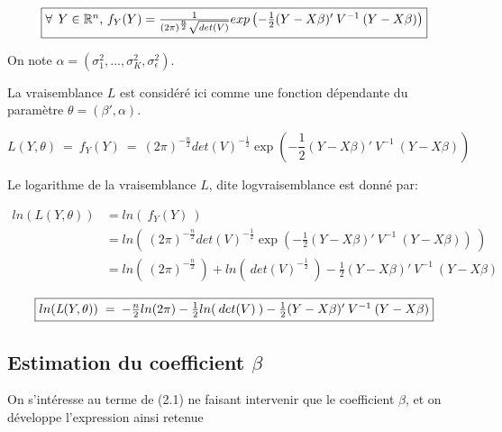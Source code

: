 \documentclass[11pt,fleqn]{book} %
\begin{document}
	\begin{equation*}
		\fbox{$
			\forall\:\: Y \in \mathbb{R}^{n}$, $f_{Y}(Y)=\frac{1}{(2\pi)^{\frac{n}{2}}\sqrt{det(V)}}exp\left(-\frac{1}{2}(Y-X\beta)'\:V^{-1}\:(Y-X\beta)\right) 
			$}
	\end{equation*}
	
	\vspace{1em}
	
	On note $\alpha=(\sigma_1^2,...,\sigma_K^2,\sigma_{\epsilon}^2)$.
	
	
	\vspace{1em}
	
	La vraisemblance $L$ est considéré ici comme une fonction dépendante du paramètre $\theta=(\beta',\alpha)$.
	
	
	\begin{equation*}
		\textit{L}(Y,\theta) \:=\:  f_{Y}(Y) \:=\:  (2\pi)^{-\frac{n}{2}} det(V)^{-\frac{1}{2}} \exp\left(-\frac{1}{2}(Y-X\beta)'\:V^{-1}\:(Y-X\beta)\right)
	\end{equation*}
	
	\vspace{1em}
	
	Le logarithme de la vraisemblance $L$, dite logvraisemblance est donné par:
	
	\begin{align*}
		ln(\textit{L}(Y,\theta)) &= ln(\: f_{Y}(Y) \:)\\
		&= ln\left(\: (2\pi)^{-\frac{n}{2}} det(V)^{-\frac{1}{2}} \exp\left(-\frac{1}{2}(Y-X\beta)'\:V^{-1}\:(Y-X\beta)\right) \: \right) \\
		&= ln(\:(2\pi)^{-\frac{n}{2}}\:) + ln(\:det(V)^{-\frac{1}{2}}\:) -\frac{1}{2} (Y-X\beta)'\:V^{-1}\:(Y-X\beta) 
	\end{align*}
	
	
	\begin{equation}
		\fbox{$
			ln(\textit{L}(Y,\theta)) \;=\: -\frac{n}{2} ln(2\pi) -\frac{1}{2} ln(\:det(V)\:) -\frac{1}{2}  (Y-X\beta)'\:V^{-1}\:(Y-X\beta)
			$}
	\end{equation}
	
	\vspace{2em}
	
	\subsection{Estimation du coefficient $\beta$}
	
	\vspace{2em}
	
	On s'intéresse au terme de (2.1) ne faisant intervenir que le coefficient $\beta$, et on développe l'expression ainsi retenue
	
\end{document}
